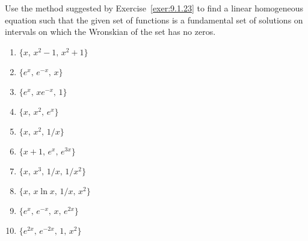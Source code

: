 \documentclass{ximera}
\begin{document}
\begin{problem}\label{exer:9.1.24}
Use the method suggested by Exercise~\ref{exer:9.1.23}  to find a linear
homogeneous equation such that the given set of functions
is a fundamental set of solutions on intervals on which the Wronskian
of the set has no zeros.

\begin{enumerate}
 \item  $\{x,\,x^2-1,\,x^2+1\}$
 
 \item  $\{e^x,\,e^{-x},\,x\}$

 \item  $\{e^x,\,xe^{-x},\,1\}$
 
\item $\{x,\,x^2,\,e^x\}$

 \item $\{x,\,x^2,\,1/x\}$
 
\item $\{x+1,\,e^x,\,e^{3x}\}$

 \item $\{x,\,x^3,\,1/x,\,1/x^2\}$
 
  \item $\{x,\,x\ln x,\,1/x,\,x^2\}$

 \item $\{e^x,\,e^{-x},\,x,\,e^{2x}\}$
 
  \item $\{e^{2x},\,e^{-2x},\,1,\,x^2\}$
\end{enumerate}
\end{problem}
\end{document}
